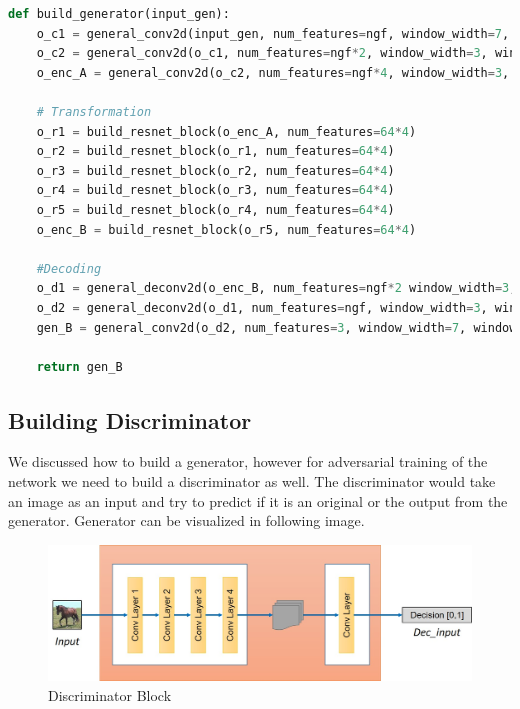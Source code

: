 \documentclass[peerreview]{IEEEtran}
\begin{document}
\begin{lstlisting}[language=Python]
def build_generator(input_gen):
    o_c1 = general_conv2d(input_gen, num_features=ngf, window_width=7, window_height=7, stride_width=1, stride_height=1)
    o_c2 = general_conv2d(o_c1, num_features=ngf*2, window_width=3, window_height=3, stride_width=2, stride_height=2)
    o_enc_A = general_conv2d(o_c2, num_features=ngf*4, window_width=3, window_height=3, stride_width=2, stride_height=2)

    # Transformation
    o_r1 = build_resnet_block(o_enc_A, num_features=64*4)
    o_r2 = build_resnet_block(o_r1, num_features=64*4)
    o_r3 = build_resnet_block(o_r2, num_features=64*4)
    o_r4 = build_resnet_block(o_r3, num_features=64*4)
    o_r5 = build_resnet_block(o_r4, num_features=64*4)
    o_enc_B = build_resnet_block(o_r5, num_features=64*4)

    #Decoding
    o_d1 = general_deconv2d(o_enc_B, num_features=ngf*2 window_width=3, window_height=3, stride_width=2, stride_height=2)
    o_d2 = general_deconv2d(o_d1, num_features=ngf, window_width=3, window_height=3, stride_width=2, stride_height=2)
    gen_B = general_conv2d(o_d2, num_features=3, window_width=7, window_height=7, stride_width=1, stride_height=1)

    return gen_B
\end{lstlisting}

\subsection{Building Discriminator}
We discussed how to build a generator, however for adversarial training of the network we need to build a discriminator as well. The discriminator would take an image as an input and try to predict if it is an original or the output from the generator. Generator can be visualized in following image.

\begin{figure}[H]
    \centering
    \includegraphics[width=0.8\columnwidth]{discriminator.jpg}
    \caption{Discriminator Block}
    \label{fig:s=discriminator}
\end{figure}
\end{document}
